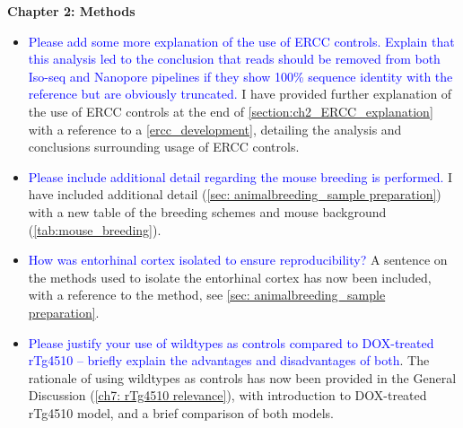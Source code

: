 \documentclass[a4paper,12pt,oneside]{report}
\begin{document}
\vspace{1cm}
\textbf{Chapter 2: Methods} 
\begin{itemize}
	\item \textcolor{blue}{Please add some more explanation of the use of ERCC controls. Explain that this analysis led to the conclusion that reads should be removed from both Iso-seq and Nanopore pipelines if they show 100\% sequence identity with the reference but are obviously truncated.} 
	\newline I have provided further explanation of the use of ERCC controls at the end of \cref{section:ch2_ERCC_explanation} with a reference to a \cref{ercc_development}, detailing the analysis and conclusions surrounding usage of ERCC controls.
	\item \textcolor{blue}{Please include additional detail regarding the mouse breeding is performed.}
	\newline I have included additional detail (\cref{sec: animalbreeding_sample preparation}) with a new table of the breeding schemes and mouse background (\cref{tab:mouse_breeding}).
	\item \textcolor{blue}{How was entorhinal cortex isolated to ensure reproducibility?} 
	\newline A sentence on the methods used to isolate the entorhinal cortex has now been included, with a reference to the method, see \cref{sec: animalbreeding_sample preparation}. 
	\item \textcolor{blue}{Please justify your use of wildtypes as controls compared to DOX-treated rTg4510 – briefly explain the advantages and disadvantages of both}. 
	\newline The rationale of using wildtypes as controls has now been provided in the General Discussion (\cref{ch7: rTg4510 relevance}), with introduction to DOX-treated rTg4510 model, and a brief comparison of both models.
\end{itemize}
\end{document}
